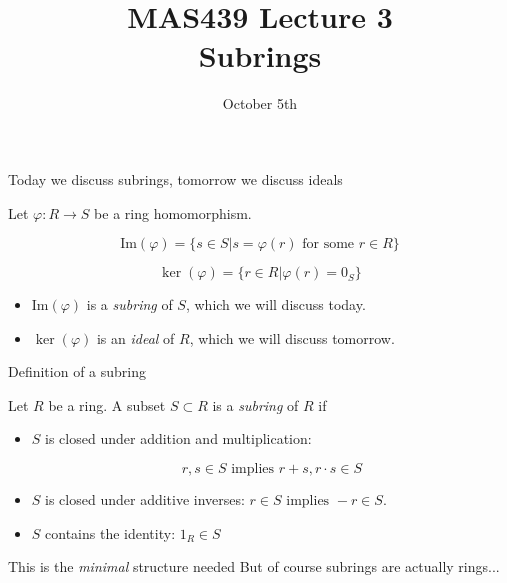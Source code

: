 \documentclass{beamer}
\title{MAS439 Lecture 3 \\ Subrings}
\date{October 5th}
\begin{document}
\begin{frame}
\titlepage
\end{frame}


\begin{frame}{Today we discuss subrings, tomorrow we discuss ideals}

Let $\varphi:R\to S$ be a ring homomorphism.  

\begin{definition}[image]
 $$\textrm{Im}(\varphi)=\{s\in S| s=\varphi(r) \text{ for some } r\in R\}$$
\end{definition}

\begin{definition}[kernel]
$$\ker(\varphi)=\{r\in R | \varphi(r)=0_S\}$$
\end{definition}


\begin{itemize}
\item $\textrm{Im}(\varphi)$ is a \emph{subring} of $S$, which we will discuss today.
\item $\ker(\varphi)$ is an \emph{ideal} of $R$, which we will discuss tomorrow.
\end{itemize}
\end{frame}


\begin{frame}{Definition of a subring}


Let $R$ be a ring.  A subset $S\subset R$ is a \emph{subring} of $R$ if
\begin{itemize}
\item $S$ is closed under addition and multiplication:

$$r,s\in S \text{ implies } r+s, r\cdot s\in S$$

\item $S$ is closed under additive inverses: $r\in S \text{ implies } -r\in S$.
\item $S$ contains the identity: $1_R\in S$

\end{itemize}

\begin{block}{This is the \emph{minimal} structure needed}
But of course subrings are actually rings...
\end{block}


\end{frame}
\end{document}
